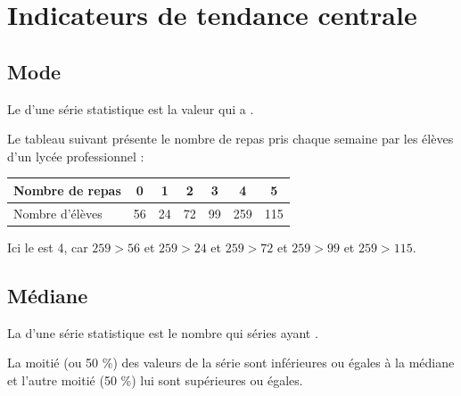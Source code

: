 \documentclass[12pt,a4paper]{article}
\date{}
\title{}
\begin{document}
{}

\section{Indicateurs de tendance centrale}


\subsection{Mode}
\begin{mydef}
	Le  d'une série statistique est la valeur qui a .
\end{mydef}


\begin{myex}
	
	Le tableau suivant présente le nombre de repas pris chaque semaine par les élèves d'un lycée professionnel :
	
	\begin{center}
		\begin{tabular}{|@{\ }l@{\ }|@{\ }c@{\ }|@{\ }c@{\ }|@{\ }c@{\ }|@{\ }c@{\ }|@{\ }c@{\ }|@{\ }c@{\ }|}
			\hline
			Nombre de repas & 0 & 1 & 2 & 3 & 4 & 5 \\ \hline
			Nombre d'élèves & 56 & 24 & 72 & 99 & 259 & 115 \\ \hline
		\end{tabular}
	\end{center}
	
	Ici le  est 4, car $259 > 56$ et $259 > 24$ et $259 > 72$ et $259 > 99$ et $259 > 115$.
\end{myex}


\subsection{Médiane}

\begin{mydef}
	La  d'une série statistique est le nombre qui  séries ayant .
	
	La moitié (ou 50 \%)  des valeurs de la série sont inférieures ou égales à la médiane et l'autre moitié (50 \%) lui sont supérieures ou égales.
\end{mydef}
\end{document}
